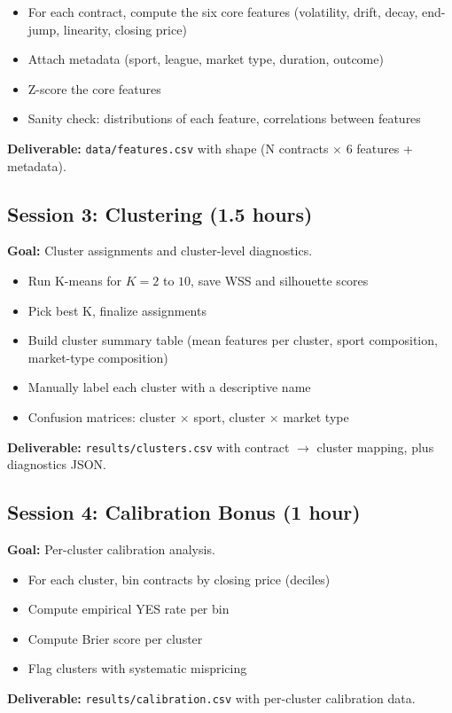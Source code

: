 \documentclass[11pt]{article}
\begin{document}
\begin{itemize}[leftmargin=*, itemsep=0pt]
    \item For each contract, compute the six core features (volatility, drift, decay, end-jump, linearity, closing price)
    \item Attach metadata (sport, league, market type, duration, outcome)
    \item Z-score the core features
    \item Sanity check: distributions of each feature, correlations between features
\end{itemize}
\textbf{Deliverable:} \texttt{data/features.csv} with shape (N contracts $\times$ 6 features + metadata).

\subsection*{Session 3: Clustering (1.5 hours)}
\textbf{Goal:} Cluster assignments and cluster-level diagnostics.

\begin{itemize}[leftmargin=*, itemsep=0pt]
    \item Run K-means for $K = 2$ to $10$, save WSS and silhouette scores
    \item Pick best K, finalize assignments
    \item Build cluster summary table (mean features per cluster, sport composition, market-type composition)
    \item Manually label each cluster with a descriptive name
    \item Confusion matrices: cluster $\times$ sport, cluster $\times$ market type
\end{itemize}
\textbf{Deliverable:} \texttt{results/clusters.csv} with contract $\to$ cluster mapping, plus diagnostics JSON.

\subsection*{Session 4: Calibration Bonus (1 hour)}
\textbf{Goal:} Per-cluster calibration analysis.

\begin{itemize}[leftmargin=*, itemsep=0pt]
    \item For each cluster, bin contracts by closing price (deciles)
    \item Compute empirical YES rate per bin
    \item Compute Brier score per cluster
    \item Flag clusters with systematic mispricing
\end{itemize}
\textbf{Deliverable:} \texttt{results/calibration.csv} with per-cluster calibration data.
\end{document}
